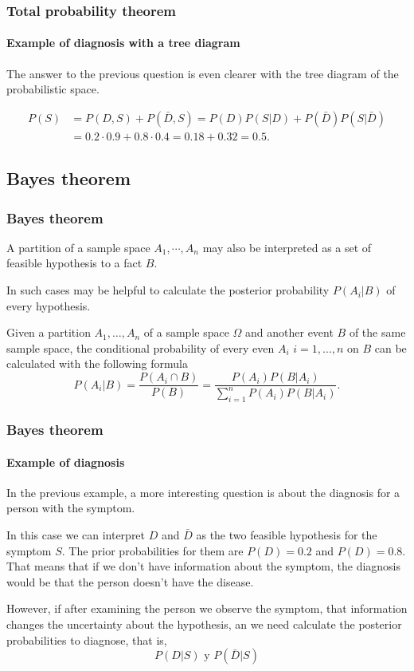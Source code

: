 \begin{frame}
\frametitle{Total probability theorem}
\framesubtitle{Example of diagnosis with a tree diagram}
The answer to the previous question is even clearer with the tree diagram of the probabilistic space.

\begin{center}
\end{center}

\begin{align*}
P(S) &= P(D,S) + P(\bar D,S) = P(D)P(S|D)+P(\bar D)P(S|\bar D)\\
& = 0.2\cdot 0.9+ 0.8\cdot 0.4 = 0.18 + 0.32 = 0.5.
\end{align*}
\end{frame}


\subsection{Bayes theorem}

\begin{frame}
\frametitle{Bayes theorem}
A partition of a sample space $A_1,\cdots,A_n$ may also be interpreted as a set of feasible hypothesis to a fact
$B$.

In such cases may be helpful to calculate the posterior probability $P(A_i|B)$ of every hypothesis.

\begin{theorem}[Bayes]
Given a partition $A_1,\ldots,A_n$ of a sample space $\Omega$ and another event $B$ of the same sample space, the
conditional probability of every even $A_i$ $i=1,\ldots,n$ on $B$ can be calculated with the following formula
\[
P(A_i|B) = \frac{P(A_i\cap B)}{P(B)} = \frac{P(A_i)P(B|A_i)}{\sum_{i=1}^n P(A_i)P(B|A_i)}.
\]
\end{theorem}
\end{frame}


\begin{frame}
\frametitle{Bayes theorem}
\framesubtitle{Example of diagnosis}
In the previous example, a more interesting question is about the diagnosis for a person with the symptom.  

In this case we can interpret $D$ and $\bar D$ as the two feasible hypothesis for the symptom $S$.
The prior probabilities for them are $P(D)=0.2$ and $P(D)=0.8$.
That means that if we don't have information about the symptom, the diagnosis would be that the person doesn't have the
disease.

However, if after examining the person we observe the symptom, that information changes the uncertainty about the
hypothesis, an we need calculate the posterior probabilities to diagnose, that is,
\[
P(D|S) \mbox{ y } P(\bar D|S)
\]
\end{frame}


